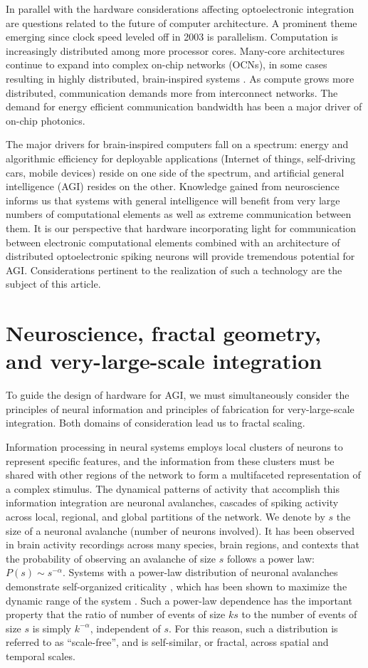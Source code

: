 \documentclass[twocolumn]{article}
\begin{document}
In parallel with the hardware considerations affecting optoelectronic integration are questions related to the future of computer architecture. A prominent theme emerging since clock speed leveled off in 2003 \cite{} is parallelism. Computation is increasingly distributed among more processor cores. Many-core architectures continue to expand into complex on-chip networks (OCNs), in some cases resulting in highly distributed, brain-inspired systems \cite{}. As compute grows more distributed, communication demands more from interconnect networks. The demand for energy efficient communication bandwidth has been a major driver of on-chip photonics.

The major drivers for brain-inspired computers fall on a spectrum: energy and algorithmic efficiency for deployable applications (Internet of things, self-driving cars, mobile devices) reside on one side of the spectrum, and artificial general intelligence (AGI) resides on the other. Knowledge gained from neuroscience informs us that systems with general intelligence will benefit from very large numbers of computational elements as well as extreme communication between them. It is our perspective that hardware incorporating light for communication between electronic computational elements combined with an architecture of distributed optoelectronic spiking neurons will provide tremendous potential for AGI. Considerations pertinent to the realization of such a technology are the subject of this article.

\section{\label{sec:neuroFractalsAndVLSI}Neuroscience, fractal geometry, and very-large-scale integration}
To guide the design of hardware for AGI, we must simultaneously consider the principles of neural information and principles of fabrication for very-large-scale integration. Both domains of consideration lead us to fractal scaling.

Information processing in neural systems employs local clusters of neurons to represent specific features, and the information from these clusters must be shared with other regions of the network to form a multifaceted representation of a complex stimulus. The dynamical patterns of activity that accomplish this information integration are neuronal avalanches, cascades of spiking activity across local, regional, and global partitions of the network. We denote by $s$ the size of a neuronal avalanche (number of neurons involved). It has been observed in brain activity recordings across many species, brain regions, and contexts that the probability of observing an avalanche of size $s$ follows a power law: $P(s)\sim s^{-\alpha}$. Systems with a power-law distribution of neuronal avalanches demonstrate self-organized criticality \cite{}, which has been shown to maximize the dynamic range of the system \cite{}. Such a power-law dependence has the important property that the ratio of number of events of size $ks$ to the number of events of size $s$ is simply $k^{-\alpha}$, independent of $s$. For this reason, such a distribution is referred to as ``scale-free'', and is self-similar, or fractal, across spatial and temporal scales. 
\end{document}

